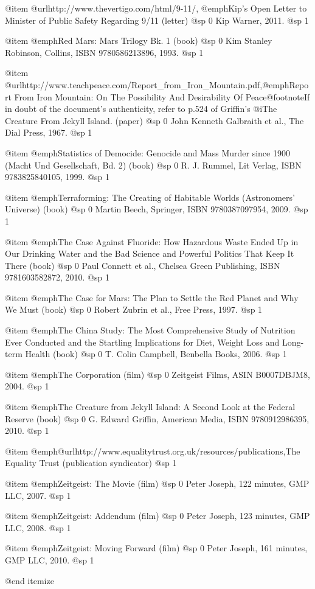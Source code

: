 @item
@url{http://www.thevertigo.com/html/9-11/, @emph{Kip's Open Letter to Minister of Public Safety Regarding 9/11}} (letter)
@sp 0
Kip Warner, 2011.
@sp 1

@item
@emph{Red Mars: Mars Trilogy Bk. 1} (book)
@sp 0
Kim Stanley Robinson, Collins, ISBN 9780586213896, 1993.
@sp 1

@item
@url{http://www.teachpeace.com/Report_from_Iron_Mountain.pdf,@emph{Report From Iron Mountain: On The Possibility And Desirability Of Peace}}@footnote{If in doubt of the document's authenticity, refer to p.524 of Griffin's @i{The Creature From Jekyll Island}.} (paper)
@sp 0
John Kenneth Galbraith et al., The Dial Press, 1967.
@sp 1

@item
@emph{Statistics of Democide: Genocide and Mass Murder since 1900 (Macht Und Gesellschaft, Bd. 2)} (book)
@sp 0
R. J. Rummel, Lit Verlag, ISBN 9783825840105, 1999.
@sp 1

@item
@emph{Terraforming: The Creating of Habitable Worlds (Astronomers' Universe)} (book)
@sp 0
Martin Beech, Springer, ISBN 9780387097954, 2009.
@sp 1

@item
@emph{The Case Against Fluoride: How Hazardous Waste Ended Up in Our Drinking Water and the Bad Science and Powerful Politics That Keep It There} (book)
@sp 0
Paul Connett et al., Chelsea Green Publishing, ISBN 9781603582872, 2010.
@sp 1

@item
@emph{The Case for Mars: The Plan to Settle the Red Planet and Why We Must} (book)
@sp 0
Robert Zubrin et al., Free Press, 1997.
@sp 1

@item
@emph{The China Study: The Most Comprehensive Study of Nutrition Ever Conducted and the Startling Implications for Diet, Weight Loss and Long-term Health} (book)
@sp 0
T. Colin Campbell, Benbella Books, 2006.
@sp 1

@item
@emph{The Corporation} (film)
@sp 0
Zeitgeist Films, ASIN B0007DBJM8, 2004.
@sp 1

@item
@emph{The Creature from Jekyll Island: A Second Look at the Federal Reserve} (book)
@sp 0
G. Edward Griffin, American Media, ISBN 9780912986395, 2010.
@sp 1

@item
@emph{@url{http://www.equalitytrust.org.uk/resources/publications,The Equality Trust}} (publication syndicator)
@sp 1

@item
@emph{Zeitgeist: The Movie} (film)
@sp 0
Peter Joseph, 122 minutes, GMP LLC, 2007.
@sp 1

@item
@emph{Zeitgeist: Addendum} (film)
@sp 0
Peter Joseph, 123 minutes, GMP LLC, 2008.
@sp 1

@item
@emph{Zeitgeist: Moving Forward} (film)
@sp 0
Peter Joseph, 161 minutes, GMP LLC, 2010.
@sp 1

@end itemize

